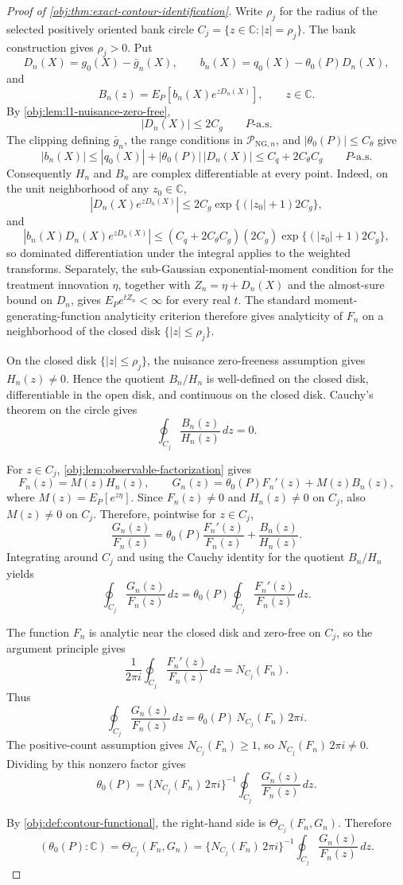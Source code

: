 \documentclass[11pt]{article}
\begin{document}
\begin{proof}[Proof of \cref{obj:thm:exact-contour-identification}]
Write \(\rho_j\) for the radius of the selected positively oriented bank circle \(C_j=\{z\in\mathbb C:|z|=\rho_j\}\).  The bank construction gives \(\rho_j>0\).  Put
\[
D_n(X)=g_0(X)-\bar g_n(X),\qquad
b_n(X)=q_0(X)-\theta_0(P)D_n(X),
\]
and
\[
B_n(z)=E_P\!\left[b_n(X)e^{zD_n(X)}\right],\qquad z\in\mathbb C .
\]
By \cref{obj:lem:l1-nuisance-zero-free},
\[
|D_n(X)|\le 2C_g\qquad P\text{-a.s.}
\]
The clipping defining \(\bar g_n\), the range conditions in \(\mathcal P_{\mathrm{NG},n}\), and \(|\theta_0(P)|\le C_\theta\) give
\[
|b_n(X)|
\le |q_0(X)|+|\theta_0(P)|\,|D_n(X)|
\le C_q+2C_\theta C_g
\qquad P\text{-a.s.}
\]
Consequently \(H_n\) and \(B_n\) are complex differentiable at every point.  Indeed, on the unit neighborhood of any \(z_0\in\mathbb C\),
\[
|D_n(X)e^{zD_n(X)}|
\le 2C_g\exp\{(|z_0|+1)2C_g\},
\]
and
\[
|b_n(X)D_n(X)e^{zD_n(X)}|
\le (C_q+2C_\theta C_g)(2C_g)
   \exp\{(|z_0|+1)2C_g\},
\]
so dominated differentiation under the integral applies to the weighted transforms.  Separately, the sub-Gaussian exponential-moment condition for the treatment innovation \(\eta\), together with \(Z_n=\eta+D_n(X)\) and the almost-sure bound on \(D_n\), gives \(E_P e^{tZ_n}<\infty\) for every real \(t\).  The standard moment-generating-function analyticity criterion therefore gives analyticity of \(F_n\) on a neighborhood of the closed disk \(\{|z|\le \rho_j\}\).

On the closed disk \(\{|z|\le\rho_j\}\), the nuisance zero-freeness assumption gives \(H_n(z)\ne0\).  Hence the quotient \(B_n/H_n\) is well-defined on the closed disk, differentiable in the open disk, and continuous on the closed disk.  Cauchy's theorem on the circle gives
\[
\oint_{C_j}\frac{B_n(z)}{H_n(z)}\,dz=0 .
\]

For \(z\in C_j\), \cref{obj:lem:observable-factorization} gives
\[
F_n(z)=M(z)H_n(z),
\qquad
G_n(z)=\theta_0(P)F_n'(z)+M(z)B_n(z),
\]
where \(M(z)=E_P[e^{z\eta}]\).  Since \(F_n(z)\ne0\) and \(H_n(z)\ne0\) on \(C_j\), also \(M(z)\ne0\) on \(C_j\).  Therefore, pointwise for \(z\in C_j\),
\[
\frac{G_n(z)}{F_n(z)}
=
\theta_0(P)\frac{F_n'(z)}{F_n(z)}
+
\frac{B_n(z)}{H_n(z)} .
\]
Integrating around \(C_j\) and using the Cauchy identity for the quotient \(B_n/H_n\) yields
\[
\oint_{C_j}\frac{G_n(z)}{F_n(z)}\,dz
=
\theta_0(P)
\oint_{C_j}\frac{F_n'(z)}{F_n(z)}\,dz .
\]

The function \(F_n\) is analytic near the closed disk and zero-free on \(C_j\), so the argument principle gives
\[
\frac{1}{2\pi i}
\oint_{C_j}\frac{F_n'(z)}{F_n(z)}\,dz
=
N_{C_j}(F_n).
\]
Thus
\[
\oint_{C_j}\frac{G_n(z)}{F_n(z)}\,dz
=
\theta_0(P)\,N_{C_j}(F_n)\,2\pi i .
\]
The positive-count assumption gives \(N_{C_j}(F_n)\ge1\), so \(N_{C_j}(F_n)\,2\pi i\ne0\).  Dividing by this nonzero factor gives
\[
\theta_0(P)
=
\{N_{C_j}(F_n)\,2\pi i\}^{-1}
\oint_{C_j}\frac{G_n(z)}{F_n(z)}\,dz .
\]

By \cref{obj:def:contour-functional}, the right-hand side is \(\Theta_{C_j}(F_n,G_n)\).  Therefore
\[
(\theta_0(P):\mathbb C)
=
\Theta_{C_j}(F_n,G_n)
=
\{N_{C_j}(F_n)\,2\pi i\}^{-1}
\oint_{C_j}\frac{G_n(z)}{F_n(z)}\,dz .
\]
\end{proof}
\end{document}
